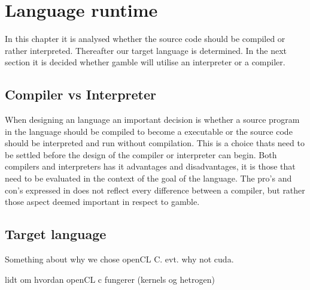 \chapter{Language runtime}
In this chapter it is analysed whether the source code should be compiled or rather interpreted.
Thereafter our target language is determined.
In the next section it is decided whether \gls{gamble} will utilise an interpreter or a compiler.

\section{Compiler vs Interpreter}
When designing an language an important decision is whether a source program in the language should be compiled to become a executable or the source code should be interpreted and run without compilation.
This is a choice thats need to be settled before the design of the compiler or interpreter can begin.
Both compilers and interpreters has it advantages and disadvantages, it is those that need to be evaluated in the context of the goal of the language.
The pro's and con's expressed in  does not reflect every difference between a compiler, but rather those aspect deemed important in respect to \gls{gamble}.



\section{Target language}
Something about why we chose openCL C. 
 evt. why not cuda.

 lidt om hvordan openCL c fungerer (kernels og hetrogen)